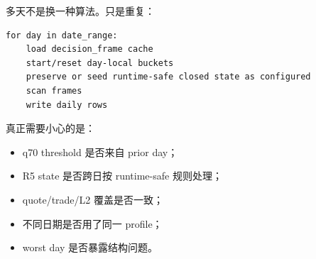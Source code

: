 多天不是换一种算法。只是重复：

\begin{lstlisting}
for day in date_range:
    load decision_frame cache
    start/reset day-local buckets
    preserve or seed runtime-safe closed state as configured
    scan frames
    write daily rows
\end{lstlisting}

真正需要小心的是：

\begin{itemize}[leftmargin=2em]
  \item q70 threshold 是否来自 prior day；
  \item R5 state 是否跨日按 runtime-safe 规则处理；
  \item quote/trade/L2 覆盖是否一致；
  \item 不同日期是否用了同一 profile；
  \item worst day 是否暴露结构问题。
\end{itemize}

